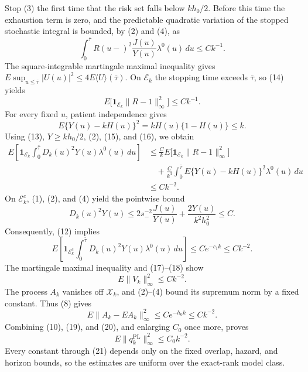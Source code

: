 Stop (3) the first time that the risk set falls below \(kh_0/2\).  Before this time the exhaustion term is zero, and the predictable quadratic variation of the stopped stochastic integral is bounded, by (2) and (4), as
\[
 \int_0^{\bar\tau}R(u-)^2\frac{J(u)}{Y(u)}\lambda^0(u)\,du
 \le Ck^{-1}.                                                 \tag{14}
\]
The square-integrable martingale maximal inequality gives \(E\sup_{u\le\bar\tau}|U(u)|^2\le4E\langle U\rangle(\bar\tau)\).  On \(\mathcal E_k\) the stopping time exceeds \(\bar\tau\), so (14) yields
\[
 E\bigl[\mathbf 1_{\mathcal E_k}\|R-1\|_\infty^2\bigr]
 \le Ck^{-1}.                                                 \tag{15}
\]
For every fixed \(u\), patient independence gives
\[
 E\{Y(u)-kH(u)\}^2=kH(u)\{1-H(u)\}\le k.                  \tag{16}
\]
Using (13), \(Y\ge kh_0/2\), (2), (15), and (16), we obtain
\[
 \begin{aligned}
 E\left[\mathbf 1_{\mathcal E_k}
   \int_0^{\bar\tau}D_k(u)^2Y(u)\lambda^0(u)\,du\right]
 &\le \frac{C}{k}E\bigl[\mathbf 1_{\mathcal E_k}\|R-1\|_\infty^2\bigr]\\
 &\quad+\frac{C}{k^3}\int_0^{\bar\tau}
       E\{Y(u)-kH(u)\}^2\lambda^0(u)\,du\\
 &\le Ck^{-2}.
 \end{aligned}                                                 \tag{17}
\]
On \(\mathcal E_k^c\), (1), (2), and (4) yield the pointwise bound
\[
 D_k(u)^2Y(u)
 \le 2s_-^{-2}\frac{J(u)}{Y(u)}+\frac{2Y(u)}{k^2h_0^2}
 \le C.
\]
Consequently, (12) implies
\[
 E\left[\mathbf 1_{\mathcal E_k^c}
   \int_0^{\bar\tau}D_k(u)^2Y(u)\lambda^0(u)\,du\right]
 \le Ce^{-c_1k}\le Ck^{-2}.                                 \tag{18}
\]
The martingale maximal inequality and (17)--(18) show
\[
 E\|V_k\|_\infty^2\le Ck^{-2}.                              \tag{19}
\]
The process \(A_k\) vanishes off \(\mathcal X_k\), and (2)--(4) bound its supremum norm by a fixed constant.  Thus (8) gives
\[
 E\|A_k-EA_k\|_\infty^2\le Ce^{-h_0k}\le Ck^{-2}.           \tag{20}
\]
Combining (10), (19), and (20), and enlarging \(C_0\) once more, proves
\[
 E\|q_k^{\mathrm{PL}}\|_\infty^2\le C_0k^{-2}.             \tag{21}
\]
Every constant through (21) depends only on the fixed overlap, hazard, and horizon bounds, so the estimates are uniform over the exact-rank model class.

